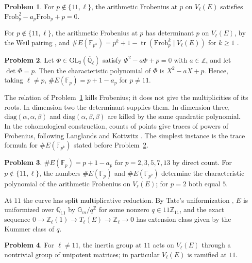 \documentclass[reqno]{amsart}
\theoremstyle{definition}
\newtheorem{problem}{Problem}[section]
\theoremstyle{plain}
\newcommand{\Z}{\mathbb{Z}}
\newcommand{\Q}{\mathbb{Q}}
\newcommand{\F}{\mathbb{F}}
\newcommand{\Qlb}{\overline{\Q}_\ell}
\newcommand{\GL}{\mathrm{GL}}
\newcommand{\Frob}{\mathrm{Frob}}
\newcommand{\tr}{\operatorname{tr}}
\begin{document}
\begin{problem}\label{pr:annihilate}
For \(p \notin \{11, \ell\}\), the arithmetic Frobenius at \(p\) on \(V_\ell(E)\) satisfies \(\Frob_p^2 - a_p\Frob_p + p = 0\).
\end{problem}

For \(p \notin \{11, \ell\}\), the arithmetic Frobenius at \(p\) has determinant \(p\) on \(V_\ell(E)\), by the Weil pairing \cite[\S III.8]{Si1}, and \(\#E(\F_{p^k}) = p^k + 1 - \tr(\Frob_p^k \mid V_\ell(E))\) for \(k \ge 1\) \cite[\S V.2]{Si1}.

\begin{problem}\label{pr:charpoly}
Let \(\Phi \in \GL_2(\Qlb)\) satisfy \(\Phi^2 - a\Phi + p = 0\) with \(a \in \Z\), and let \(\det\Phi = p\).  Then the characteristic polynomial of \(\Phi\) is \(X^2 - aX + p\).  Hence, taking \(\ell \ne p\), \(\#E(\F_p) = p + 1 - a_p\) for \(p \ne 11\).
\end{problem}

The relation of Problem~\ref{pr:annihilate} kills Frobenius; it does not give the multiplicities of its roots.  In dimension two the determinant supplies them.  In dimension three, \(\mathrm{diag}(\alpha, \alpha, \beta)\) and \(\mathrm{diag}(\alpha, \beta, \beta)\) are killed by the same quadratic polynomial.  In the cohomological construction, counts of points give traces of powers of Frobenius, following Langlands and Kottwitz \cite{Ko}.  The simplest instance is the trace formula for \(\#E(\F_{p^k})\) stated before Problem~\ref{pr:charpoly}.

\begin{problem}\label{pr:count}
\(\#E(\F_p) = p + 1 - a_p\) for \(p = 2, 3, 5, 7, 13\) by direct count.  For \(p \notin \{11, \ell\}\), the numbers \(\#E(\F_p)\) and \(\#E(\F_{p^2})\) determine the characteristic polynomial of the arithmetic Frobenius on \(V_\ell(E)\); for \(p = 2\) both equal \(5\).
\end{problem}

At \(11\) the curve has split multiplicative reduction.  By Tate's uniformization \cite[Ch.~V]{Si2}, \(E\) is uniformized over \(\Q_{11}\) by \(\mathbb{G}_m/q^\Z\) for some nonzero \(q \in 11\Z_{11}\), and the exact sequence \(0 \to \Z_\ell(1) \to T_\ell(E) \to \Z_\ell \to 0\) has extension class given by the Kummer class of \(q\).

\begin{problem}\label{pr:tate}
For \(\ell \ne 11\), the inertia group at \(11\) acts on \(V_\ell(E)\) through a nontrivial group of unipotent matrices; in particular \(V_\ell(E)\) is ramified at \(11\).
\end{problem}
\end{document}
